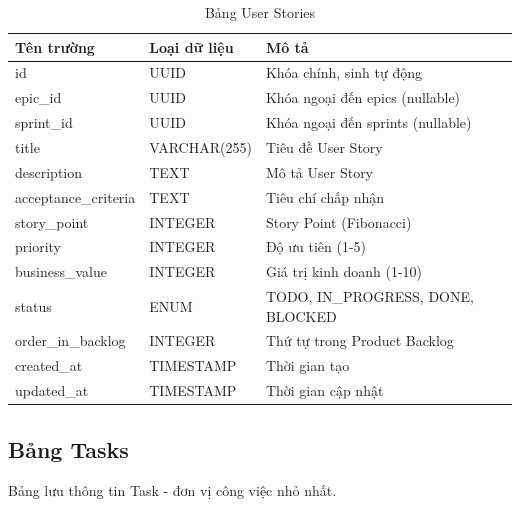 \documentclass[12pt,a4paper]{report}
\begin{document}
\begin{table}[H]
\centering
\caption{Bảng User Stories}
\begin{tabular}{|p{4cm}|p{4cm}|p{7cm}|}
\hline
\textbf{Tên trường} & \textbf{Loại dữ liệu} & \textbf{Mô tả} \\
\hline
id & UUID & Khóa chính, sinh tự động \\
\hline
epic\_id & UUID & Khóa ngoại đến epics (nullable) \\
\hline
sprint\_id & UUID & Khóa ngoại đến sprints (nullable) \\
\hline
title & VARCHAR(255) & Tiêu đề User Story \\
\hline
description & TEXT & Mô tả User Story \\
\hline
acceptance\_criteria & TEXT & Tiêu chí chấp nhận \\
\hline
story\_point & INTEGER & Story Point (Fibonacci) \\
\hline
priority & INTEGER & Độ ưu tiên (1-5) \\
\hline
business\_value & INTEGER & Giá trị kinh doanh (1-10) \\
\hline
status & ENUM & TODO, IN\_PROGRESS, DONE, BLOCKED \\
\hline
order\_in\_backlog & INTEGER & Thứ tự trong Product Backlog \\
\hline
created\_at & TIMESTAMP & Thời gian tạo \\
\hline
updated\_at & TIMESTAMP & Thời gian cập nhật \\
\hline
\end{tabular}
\label{tab:user_stories_table}
\end{table}


\subsection{Bảng Tasks}

Bảng lưu thông tin Task - đơn vị công việc nhỏ nhất.
\end{document}
